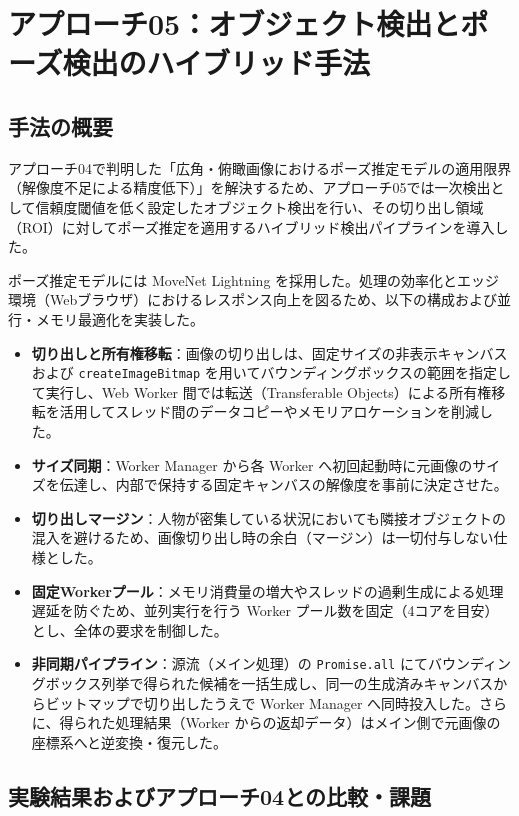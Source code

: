 \section{アプローチ05：オブジェクト検出とポーズ検出のハイブリッド手法}

\subsection{手法の概要}
アプローチ04で判明した「広角・俯瞰画像におけるポーズ推定モデルの適用限界（解像度不足による精度低下）」を解決するため、アプローチ05では一次検出として信頼度閾値を低く設定したオブジェクト検出を行い、その切り出し領域（ROI）に対してポーズ推定を適用するハイブリッド検出パイプラインを導入した。

ポーズ推定モデルには MoveNet Lightning を採用した。処理の効率化とエッジ環境（Webブラウザ）におけるレスポンス向上を図るため、以下の構成および並行・メモリ最適化を実装した。

\begin{itemize}
    \item \textbf{切り出しと所有権移転}：画像の切り出しは、固定サイズの非表示キャンバスおよび \texttt{createImageBitmap} を用いてバウンディングボックスの範囲を指定して実行し、Web Worker 間では転送（Transferable Objects）による所有権移転を活用してスレッド間のデータコピーやメモリアロケーションを削減した。
    \item \textbf{サイズ同期}：Worker Manager から各 Worker へ初回起動時に元画像のサイズを伝達し、内部で保持する固定キャンバスの解像度を事前に決定させた。
    \item \textbf{切り出しマージン}：人物が密集している状況においても隣接オブジェクトの混入を避けるため、画像切り出し時の余白（マージン）は一切付与しない仕様とした。
    \item \textbf{固定Workerプール}：メモリ消費量の増大やスレッドの過剰生成による処理遅延を防ぐため、並列実行を行う Worker プール数を固定（4コアを目安）とし、全体の要求を制御した。
    \item \textbf{非同期パイプライン}：源流（メイン処理）の \texttt{Promise.all} にてバウンディングボックス列挙で得られた候補を一括生成し、同一の生成済みキャンバスからビットマップで切り出したうえで Worker Manager へ同時投入した。さらに、得られた処理結果（Worker からの返却データ）はメイン側で元画像の座標系へと逆変換・復元した。
\end{itemize}

\subsection{実験結果およびアプローチ04との比較・課題}

